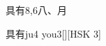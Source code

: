 \begin{entry}{具有}{8,6}{⼋、⽉}
  \begin{phonetics}{具有}{ju4 you3}[][HSK 3]
  \end{phonetics}
\end{entry}
